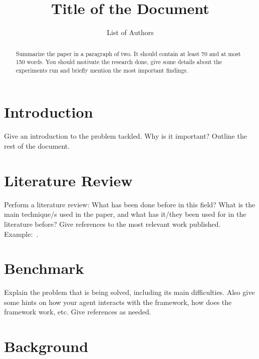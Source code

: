 \documentclass{llncs}
\begin{document}
\mainmatter

\title{Title of the Document}%
\author{List of Authors}%

\maketitle

\begin{abstract}
Summarize the paper in a paragraph of two. It should contain at least 70 and at most 150 words. You should motivate the research done, give some details about the experiments run and briefly mention the most important findings. 
\end{abstract}

\section{Introduction} \label{sec:intro}

Give an introduction to the problem tackled. Why is it important? Outline the rest of the document.

\section{Literature Review} \label{sec:lit}

Perform a literature review: What has been done before in this field? What is the main technique/s used in the paper, and what has it/they been used for in the literature before? Give references to the most relevant work published. Example:~\cite{Browne2012}.

\section{Benchmark} \label{sec:bench}

Explain the problem that is being solved, including its main difficulties. Also give some hints on how your agent interacts with the framework, how does the framework work, etc. Give references as needed.

\section{Background} \label{sec:back}
\end{document}
